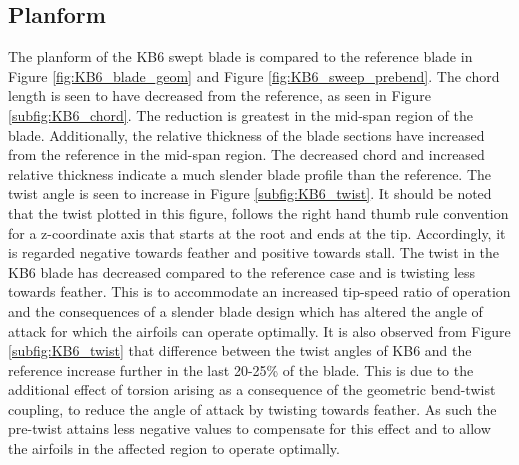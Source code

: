\subsection{Planform}
The planform of the KB6 swept blade is compared to the reference blade in Figure \ref{fig:KB6_blade_geom} and Figure \ref{fig:KB6_sweep_prebend}. The chord length is seen to have decreased from the reference, as seen in Figure \ref{subfig:KB6_chord}. The reduction is greatest in the mid-span region of the blade. Additionally, the relative thickness of the blade sections have increased from the reference in the mid-span region. The decreased chord and increased relative thickness indicate a much slender blade profile than the reference. The twist angle is seen to increase in Figure \ref{subfig:KB6_twist}. It should be noted that the twist plotted in this figure, follows the right hand thumb rule convention for a z-coordinate axis that starts at the root and ends at the tip. Accordingly, it is regarded negative towards feather and positive towards stall. The twist in the KB6 blade has decreased compared to the reference case and is twisting less towards feather. This is to accommodate an increased tip-speed ratio of operation and the consequences of a slender blade design which has altered the angle of attack for which the airfoils can operate optimally. It is also observed from Figure \ref{subfig:KB6_twist} that difference between the twist angles of KB6 and the reference increase further in the last 20-25\% of the blade. This is due to the additional effect of torsion arising as a consequence of the geometric bend-twist coupling, to reduce the angle of attack by twisting towards feather. As such the pre-twist attains less negative values to compensate for this effect and to allow the airfoils in the affected region to operate optimally.



